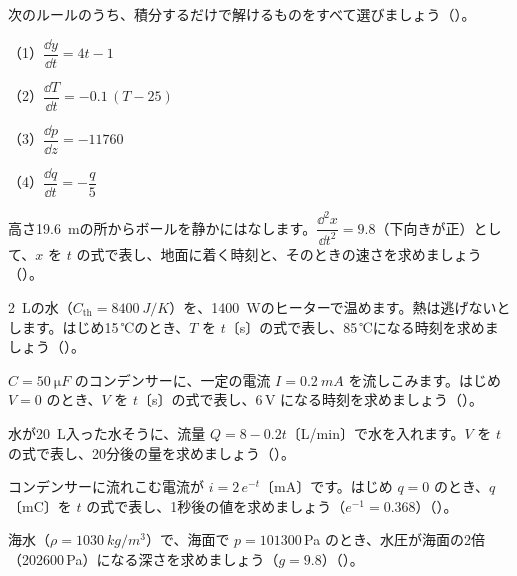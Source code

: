 \bkendproblems
{}

\bkproblem 次のルールのうち、積分するだけで解けるものをすべて選びましょう\mbox{（）}。\par
（1）$\dfrac{\dd y}{\dd t}=4t-1$\par
（2）$\dfrac{\dd T}{\dd t}=-0.1\,(T-25)$\par
（3）$\dfrac{\dd p}{\dd z}=-\num{11760}$\par
（4）$\dfrac{\dd q}{\dd t}=-\dfrac{q}{5}$

\bkproblem 高さ\qty{19.6}{m}の所からボールを静かにはなします。$\dfrac{\dd^2x}{\dd t^2}=9.8$（下向きが正）として、$x$ を $t$ の式で表し、地面に着く時刻と、そのときの速さを求めましょう\mbox{（）}。

\bkproblem \qty{2}{L}の水（$C_{\mathrm{th}}=\qty{8400}{J/K}$）を、\qty{1400}{W}のヒーターで温めます。熱は逃げないとします。はじめ15\,℃のとき、$T$ を $t$〔s〕の式で表し、85\,℃になる時刻を求めましょう\mbox{（）}。

\bkproblem $C=\qty{50}{\micro F}$ のコンデンサーに、一定の電流 $I=\qty{0.2}{mA}$ を流しこみます。はじめ $V=0$ のとき、$V$ を $t$〔s〕の式で表し、6\,V になる時刻を求めましょう\mbox{（）}。

\bkproblem 水が\qty{20}{L}入った水そうに、流量 $Q=8-0.2t$〔L/min〕で水を入れます。$V$ を $t$ の式で表し、20分後の量を求めましょう\mbox{（）}。

\bkproblem コンデンサーに流れこむ電流が $i=2\,e^{-t}$〔mA〕です。はじめ $q=0$ のとき、$q$〔mC〕を $t$ の式で表し、1秒後の値を求めましょう（$e^{-1}=0.368$）\mbox{（）}。


\bkproblem 海水（$\rho=\qty{1030}{kg/m^3}$）で、海面で $p=\num{101300}$\,Pa のとき、水圧が海面の2倍（\num{202600}\,Pa）になる深さを求めましょう（$g=9.8$）\mbox{（）}。

